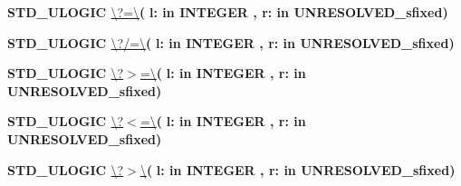 \begin{DoxyCompactItemize}
\item 
{\bfseries {\bfseries \textcolor{comment}{S\+T\+D\+\_\+\+U\+L\+O\+G\+I\+C}\textcolor{vhdlchar}{ }}} \hyperlink{classfixed__pkg_a69151531d87456d952c2073704fa1779}{\textbackslash{}?=\textbackslash{}}{\bfseries  ( }{\bfseries \textcolor{vhdlchar}{l\+: }\textcolor{stringliteral}{in }{\bfseries \textcolor{comment}{I\+N\+T\+E\+G\+E\+R}\textcolor{vhdlchar}{ }}}{\bfseries  , \textcolor{vhdlchar}{r\+: }\textcolor{stringliteral}{in }\textcolor{vhdlchar}{U\+N\+R\+E\+S\+O\+L\+V\+E\+D\+\_\+sfixed}}{\bfseries  )} 
\item 
{\bfseries {\bfseries \textcolor{comment}{S\+T\+D\+\_\+\+U\+L\+O\+G\+I\+C}\textcolor{vhdlchar}{ }}} \hyperlink{classfixed__pkg_a172a73302b09f0d298b93ecda8c5e976}{\textbackslash{}?/=\textbackslash{}}{\bfseries  ( }{\bfseries \textcolor{vhdlchar}{l\+: }\textcolor{stringliteral}{in }{\bfseries \textcolor{comment}{I\+N\+T\+E\+G\+E\+R}\textcolor{vhdlchar}{ }}}{\bfseries  , \textcolor{vhdlchar}{r\+: }\textcolor{stringliteral}{in }\textcolor{vhdlchar}{U\+N\+R\+E\+S\+O\+L\+V\+E\+D\+\_\+sfixed}}{\bfseries  )} 
\item 
{\bfseries {\bfseries \textcolor{comment}{S\+T\+D\+\_\+\+U\+L\+O\+G\+I\+C}\textcolor{vhdlchar}{ }}} \hyperlink{classfixed__pkg_a3adee8c12e5c0bb76fc3e1a493284a27}{\textbackslash{}?$>$=\textbackslash{}}{\bfseries  ( }{\bfseries \textcolor{vhdlchar}{l\+: }\textcolor{stringliteral}{in }{\bfseries \textcolor{comment}{I\+N\+T\+E\+G\+E\+R}\textcolor{vhdlchar}{ }}}{\bfseries  , \textcolor{vhdlchar}{r\+: }\textcolor{stringliteral}{in }\textcolor{vhdlchar}{U\+N\+R\+E\+S\+O\+L\+V\+E\+D\+\_\+sfixed}}{\bfseries  )} 
\item 
{\bfseries {\bfseries \textcolor{comment}{S\+T\+D\+\_\+\+U\+L\+O\+G\+I\+C}\textcolor{vhdlchar}{ }}} \hyperlink{classfixed__pkg_a271da29f659a2bc9480dbd29d7727913}{\textbackslash{}?$<$=\textbackslash{}}{\bfseries  ( }{\bfseries \textcolor{vhdlchar}{l\+: }\textcolor{stringliteral}{in }{\bfseries \textcolor{comment}{I\+N\+T\+E\+G\+E\+R}\textcolor{vhdlchar}{ }}}{\bfseries  , \textcolor{vhdlchar}{r\+: }\textcolor{stringliteral}{in }\textcolor{vhdlchar}{U\+N\+R\+E\+S\+O\+L\+V\+E\+D\+\_\+sfixed}}{\bfseries  )} 
\item 
{\bfseries {\bfseries \textcolor{comment}{S\+T\+D\+\_\+\+U\+L\+O\+G\+I\+C}\textcolor{vhdlchar}{ }}} \hyperlink{classfixed__pkg_a9e6b6b8c2c14da978e6f70cb6e85e6dc}{\textbackslash{}?$>$\textbackslash{}}{\bfseries  ( }{\bfseries \textcolor{vhdlchar}{l\+: }\textcolor{stringliteral}{in }{\bfseries \textcolor{comment}{I\+N\+T\+E\+G\+E\+R}\textcolor{vhdlchar}{ }}}{\bfseries  , \textcolor{vhdlchar}{r\+: }\textcolor{stringliteral}{in }\textcolor{vhdlchar}{U\+N\+R\+E\+S\+O\+L\+V\+E\+D\+\_\+sfixed}}{\bfseries  )} 

\end{DoxyCompactItemize}
